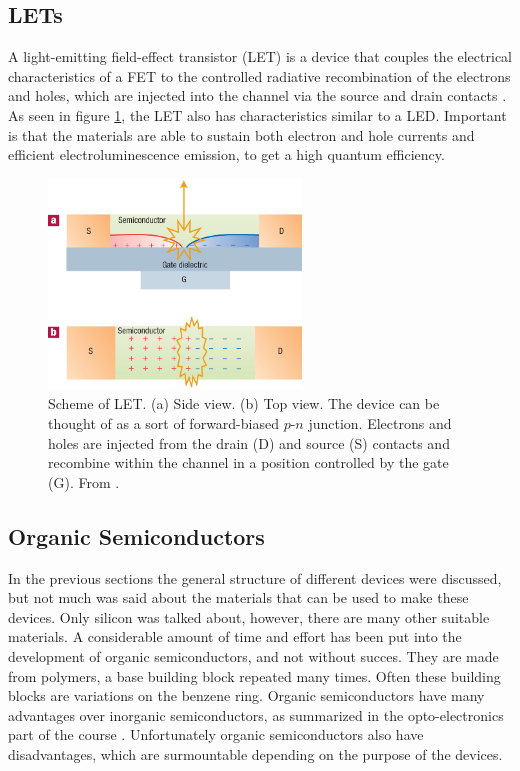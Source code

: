 \subsection{LETs}

A light-emitting field-effect transistor (LET) is a device that couples the electrical characteristics of a FET to the controlled radiative recombination of the electrons and holes, which are injected into the channel via the source and drain contacts \citep{Muccini}. As seen in figure \ref{fig:LET}, the LET also has characteristics similar to a LED. Important is that the materials are able to sustain both electron and hole currents and efficient electroluminescence emission, to get a high quantum efficiency.

\begin{figure}[!ht]
 \begin{center}
  \includegraphics[width=0.6\textwidth]{fig_B1}
  \caption{Scheme of LET. (a) Side view. (b) Top view. The device can be thought of as a sort of forward-biased $p$-$n$ junction. Electrons and holes are injected from the drain (D) and source (S) contacts and recombine within the channel in a position controlled by the gate (G). From \citet{Muccini}.}
  \label{fig:LET}
 \end{center}
\end{figure}


\subsection{Organic Semiconductors}
In the previous sections the general structure of different devices were discussed, but not much was said about the materials that can be used to make these devices. Only silicon was talked about, however, there are many other suitable materials. A considerable amount of time and effort has been put into the development of organic semiconductors, and not without succes. They are made from polymers, a base building block repeated many times. Often these building blocks are variations on the benzene ring. Organic semiconductors have many advantages over inorganic semiconductors, as summarized in the opto-electronics part of the course \citep{loinotes}. Unfortunately organic semiconductors also have disadvantages, which are surmountable depending on the purpose of the devices.

